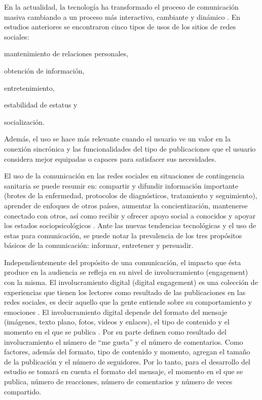 \documentclass{textolivre}
\begin{document}
 En la actualidad, la tecnología ha transformado el proceso de comunicación masiva cambiando a un proceso más interactivo, cambiante y dinámico \cite{huttHerrera2012}. En estudios anteriores \cite{ku2013} se encontraron cinco tipos de usos de los sitios de redes sociales: 
 \begin{enumerate*}[label=\arabic*)] 
 \item mantenimiento de relaciones personales, 
 \item obtención de información, 
 \item entretenimiento, 
 \item estabilidad de estatus y 
 \item socialización.
 \end{enumerate*}
 Además, el uso se hace más relevante cuando el usuario ve un valor en la conexión sincrónica y las funcionalidades del tipo de publicaciones que el usuario considera mejor equipadas o capaces para satisfacer sus necesidades. 
 
El uso de la comunicación en las redes sociales en situaciones de contingencia sanitaria se puede resumir en: compartir y difundir información importante (brotes de la enfermedad, protocolos de diagnósticos, tratamiento y seguimiento), aprender de enfoques de otros países, aumentar la concientización, mantenerse conectado con otros, así como recibir y ofrecer apoyo social a conocidos y apoyar los estados sociopsicológicos \cite{saud2020,gonzlezPadilla2020}. Ante las nuevas tendencias tecnológicas y el uso de estas para comunicación, se puede notar la prevalencia de los tres propósitos básicos de la comunicación: informar, entretener y persuadir. 

Independientemente del propósito de una comunicación, el impacto que ésta produce en la audiencia se refleja en su nivel de involucramiento (engagement) con la misma. El involucramiento digital (digital engagement) es una colección de experiencias que tienen los lectores como resultado de las publicaciones en las redes sociales, es decir aquello que la gente entiende sobre su comportamiento y emociones \cite{davisMersey2010,pletikosaCvijikj2013}. El involucramiento digital depende del formato del mensaje (imágenes, texto plano, fotos, videos y enlaces), el tipo de contenido y el momento en el que se publica \cite{pletikosaCvijikj2013}. Por su parte \textcite{sabate2014} definen como resultado del involucramiento el número de “me gusta” y el número de comentarios. Como factores, además del formato, tipo de contenido y momento, agregan el tamaño de la publicación y el número de seguidores. Por lo tanto, para el desarrollo del estudio se tomará en cuenta el formato del mensaje, el momento en el que se publica, número de reacciones, número de comentarios y número de veces compartido. 
\end{document}
